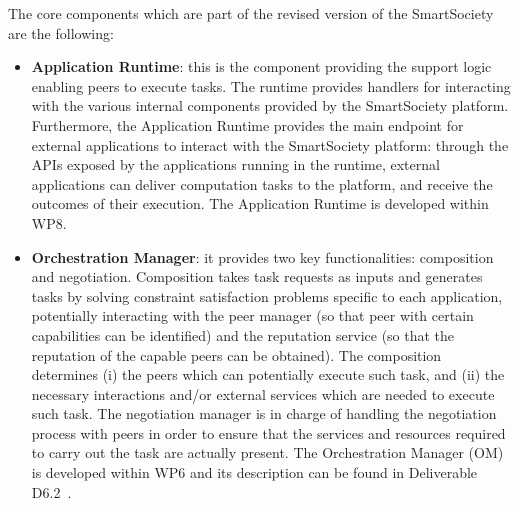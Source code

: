 
The core components which are part of the revised version of the SmartSociety are the following:
\begin{itemize}
\item \textbf{Application Runtime}: this is the component providing the support logic enabling peers to execute tasks. The runtime provides handlers for interacting with the various internal components provided by the SmartSociety platform. Furthermore, the Application Runtime provides the main endpoint for external applications to interact with the SmartSociety platform: through the APIs exposed by the applications running in the runtime, external applications can deliver computation tasks to the platform, and receive the  outcomes of their execution. The Application Runtime is developed within WP8. 

\item \textbf{Orchestration Manager}: it provides two key functionalities: composition and negotiation. Composition takes task requests as inputs and generates tasks by solving constraint satisfaction problems specific to each application, potentially interacting with the peer manager (so that peer with certain capabilities can be identified) and the reputation service (so that the reputation of the capable peers can be obtained). The composition determines (i) the peers which can potentially execute such task, and (ii) the necessary interactions and/or external services which are needed to execute such task.  The negotiation manager is in charge of handling the negotiation process with peers in order to ensure that the services and resources required to carry out the task are actually present. The Orchestration Manager (OM) is developed within WP6 and its description can be found in  Deliverable D6.2~\cite{D6.2}.


\end{itemize}
